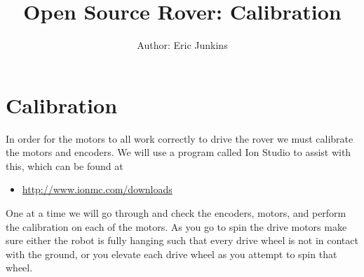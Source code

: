 \documentclass[12pt]{article}
\begin{document}
\title{Open Source Rover: Calibration}
\author{Author: Eric Junkins}

\makeatletter         
\def\@maketitle{
\begin{center}	
	\makebox[\textwidth][c]{ \texttt{[image: "Pictures/calibration".png]}}
	{\Huge \bfseries \sffamily \@title }\\[3ex] 
	{\Large \sffamily \@author}\\[3ex] 
	\texttt{[image: "Pictures/JPL logo".png]}
\end{center}}
\makeatother

\maketitle



\newpage


\tableofcontents




\section{Calibration}
\label{cal section}
In order for the motors to all work correctly to drive the rover we must calibrate the motors and encoders. We will use a program called Ion Studio to assist with this, which can be found at 
\begin{itemize}
	\item \href{http://www.ionmc.com/downloads}{http://www.ionmc.com/downloads} 
\end{itemize}

\noindent One at a time we will go through and check the encoders, motors, and perform the calibration on each of the motors. As you go to spin the drive motors make sure either the robot is fully hanging such that every drive wheel is not in contact with the ground, or you elevate each drive wheel as you attempt to spin that wheel. 
\end{document}
